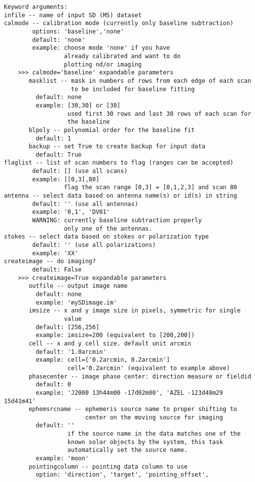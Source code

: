 \begin{verbatim}
Keyword arguments:
infile -- name of input SD (MS) dataset
calmode -- calibration mode (currently only baseline subtraction)
        options: 'baseline','none'
        default: 'none'
        example: choose mode 'none' if you have
                 already calibrated and want to do
                 plotting nd/or imaging 
    >>> calmode='baseline' expandable parameters
       masklist -- mask in numbers of rows from each edge of each scan 
                   to be included for baseline fitting
         default: none
         example: [30,30] or [30] 
                  used first 30 rows and last 30 rows of each scan for 
                  the baseline 
       blpoly -- polynomial order for the baseline fit
         default: 1
       backup -- set True to create backup for input data
         default: True
flaglist -- list of scan numbers to flag (ranges can be accepted)  
        default: [] (use all scans)
        example: [[0,3],80]
                 flag the scan range [0,3] = [0,1,2,3] and scan 80 
antenna -- select data based on antenna name(s) or id(s) in string
        default: '' (use all antennas)
        example: '0,1', 'DV01'
        WARNING: currently baseline subtraction properly 
                 only one of the antennas.
stokes -- select data based on stokes or polarization type 
        default: '' (use all polarizations)
        example: 'XX'
createimage -- do imaging? 
        default: False 
    >>> createimage=True expandable parameters
       outfile -- output image name
         default: none
         example: 'mySDimage.im'
       imsize -- x and y image size in pixels, symmetric for single 
                 value
         default: [256,256]
         example: imsize=200 (equivalent to [200,200])
       cell -- x and y cell size. default unit arcmin
         default: '1.0arcmin'
         example: cell=['0.2arcmin, 0.2arcmin']
                  cell='0.2arcmin' (equivalent to example above)
       phasecenter -- image phase center: direction measure or fieldid 
         default: 0
         example: 'J2000 13h44m00 -17d02m00', 'AZEL -123d48m29 15d41m41'
       ephemsrcname -- ephemeris source name to proper shifting to 
                       center on the moving source for imaging
         default: ''
                  if the source name in the data matches one of the 
                  known solar objects by the system, this task 
                  automatically set the source name. 
         example: 'moon' 
       pointingcolumn -- pointing data column to use
         option: 'direction', 'target', 'pointing_offset', 

\end{verbatim}
